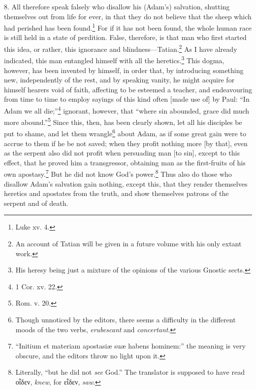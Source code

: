8. All therefore speak falsely who disallow his (Adam’s) salvation, shutting themselves out from life for ever, in that they do not believe that the sheep which had perished has been found.\footnote{Luke xv. 4.} For if it has not been found, the whole human race is still held in a state of perdition. False, therefore, is that man who first started this idea, or rather, this ignorance and blindness—Tatian.\footnote{An account of Tatian will be given in a future volume with his only extant work.}  As I have already indicated, this man entangled himself with all the heretics.\footnote{His heresy being just a mixture of the opinions of the various Gnostic sects.} This dogma, however, has been invented by himself, in order that, by introducing something new, independently of the rest, and by speaking vanity, he might acquire for himself hearers void of faith, affecting to be esteemed a teacher, and endeavouring from time to time to employ sayings of this kind often [made use of] by Paul: “In Adam we all die;”\footnote{1 Cor. xv. 22.} ignorant, however, that “where sin abounded, grace did much more abound.”\footnote{Rom. v. 20.} Since this, then, has been clearly shown, let all his disciples be put to shame, and let them wrangle\footnote{Though unnoticed by the editors, there seems a difficulty in the different moods of the two verbs, \emph{erubescant} and \emph{concertant}.} about Adam, as if some great gain were to accrue to them if he be not saved; when they profit nothing more [by that], even as the serpent also did not profit when persuading man [to sin], except to this effect, that he proved him a transgressor, obtaining man as the first-fruits of his own apostasy.\footnote{“Initium et materiam apostasiæ suæ habens hominem:” the meaning is very obscure, and the editors throw no light upon it.} But he did not know God’s power.\footnote{Literally, “but he did not \emph{see} God.” The translator is supposed to have read \textgreek{οἶδεν}, \emph{knew}, for \textgreek{εἶδεν}, \emph{saw}.} Thus also do those who disallow Adam’s salvation gain nothing, except this, that they render themselves heretics and apostates from the truth, and show themselves patrons of the serpent and of death.


